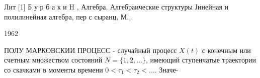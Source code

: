 \documentclass[10pt]{article}
\begin{document}
Лит [1] Б у р б а к и H , Алгебра. Алгебраические структуры Јинейная и полилинейная алгебра, пер с сыранц, М.,

1962



ПОЛУ МАРКОВСКИИ ПРОЦЕСС - случайный процесс $X(t)$ с конечным или счетным множеством состояний $N=\{1,2, \ldots\}$, имеющий ступенчатые траектории со скачками в моменты времени $0<\tau_{1}<\tau_{2}<\ldots$. Значе-
\end{document}
